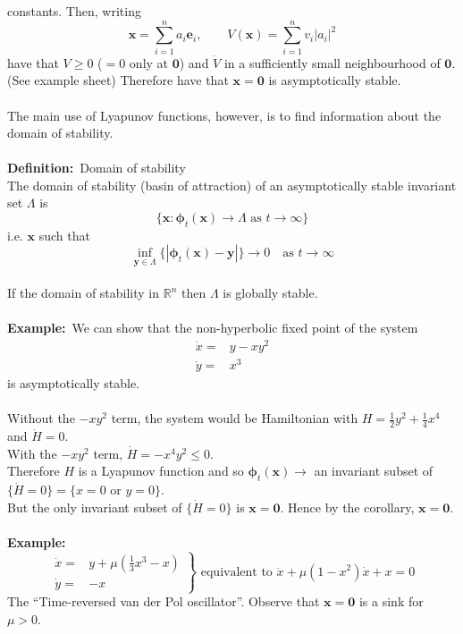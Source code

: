 \documentclass{article}
\newcommand{\example}{\textbf{Example:}}                    %
\newcommand{\definition}{\textbf{Definition:}}              %
\newcommand{\bp}{\bm{\phi}}                                 %
\newcommand{\bx}{\bm{x}}                                    %
\begin{document}
constants. Then, writing 
\[ \bx = \sum_{i=1}^{n} a_i \bm{e}_i, \qquad V(\bx) = \sum_{i=1}^{n} v_i |a_i|^2\]
have that $V \geq 0$ ($=0$ only at
$\bm{0}$) and $\dot{V}$ in a sufficiently small neighbourhood of $\bm{0}$.
(See example sheet) Therefore have that $\bx = \bm{0}$ is asymptotically
stable.
\\
\\
The main use of Lyapunov functions, however, is to find information about the
domain of stability.
\\
\\
\definition\ Domain of stability
\\
The domain of stability (basin of attraction) of an asymptotically stable
invariant set $\Lambda$ is 
\[ \{ \bx : \bp_t(\bx) \to \Lambda \mbox{ as } t \to \infty \} \]
i.e. $\bx$ such that 
\[ \inf_{\bm{y} \in \Lambda} \{| \bp_t(\bx) - \bm{y} | \} \to 0 \quad \mbox{as } t \to \infty\]
\\
If the domain of stability in $\mathbb{R}^n$ then $\Lambda$ is globally stable.
\\
\\
\example\ We can show that the non-hyperbolic fixed point of the system
\begin{align*}
 \dot{x} =& y-xy^2 \\
 \dot{y} =& x^3
\end{align*}
is asymptotically stable.
\\
\\
Without the $-xy^2$ term, the system would be Hamiltonian with 
$H = \frac{1}{2}y^2+\frac{1}{4}x^4$ and $\dot{H}=0$.
\\
With the $-xy^2$ term, $\dot{H} = -x^4 y^2 \leq 0$.
\\
Therefore $H$ is a Lyapunov function and so $\bp_t(\bx) \to$ an invariant
subset of $\{\dot{H}=0\} = \{ x = 0 \mbox{ or } y = 0 \}$.
\\
But the only invariant subset of $\{ \dot{H} = 0 \}$ is $\bx = \bm{0}$.
Hence by the corollary, $\bx = \bm{0}$.
\\
\\
\example\
\[ \left. \begin{array}{cl} \dot{x} = & y + \mu ( \frac{1}{3} x^3 - x) \\
			    \dot{y} = & -x \end{array}
\right\} \mbox{ equivalent to } \ddot{x} + \mu (1 - x^2) \dot{x} + x = 0 \]
The ``Time-reversed van der Pol oscillator''. Observe that $\bx = \bm{0}$ 
is a sink for $\mu >0$.
\\
\\
\end{document}
